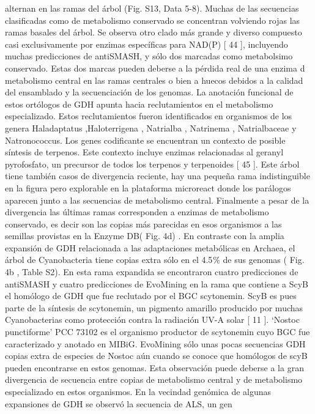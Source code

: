 \documentclass[12pt,twoside]{reedthesis}
\begin{document}
  alternan en las ramas del árbol (Fig. S13, Data 5-8). Muchas de las
  secuencias clasificadas como de metabolismo conservado se concentran
  volviendo rojas las ramas basales del árbol. Se observa otro clado más
  grande y diverso compuesto casi exclusivamente por enzimas específicas
  para NAD(P) {[} 44 {]}, incluyendo muchas predicciones de antiSMASH, y
  sólo dos marcadas como metabolsimo conservado. Estas dos marcas pueden
  deberse a la pérdida real de una enzima d metabolismo central en las
  ramas centrales o bien a huecos debidos a la calidad del ensamblado y la
  secuenciación de los genomas. La anotación funcional de estos ortólogos
  de GDH apunta hacia reclutamientos en el metabolismo especializado.
  Estos reclutamientos fueron identificados en organismos de los genera
  Haladaptatus ,Haloterrigena , Natrialba , Natrinema , Natrialbaceae y
  Natronococcus. Los genes codificante se encuentran un contexto de
  posible síntesis de terpenos. Este contexto incluye enzimas relacionadas
  al geranyl pyrofosfato, un precursor de todos los terpenos y terpenoides
  {[} 45 {]}. Este árbol tiene también casos de divergencia reciente, hay
  una pequeña rama indistinguible en la figura pero explorable en la
  plataforma microreact donde los parálogos aparecen junto a las
  secuencias de metabolismo central. Finalmente a pesar de la divergencia
  las últimas ramas corresponden a enzimas de metabolismo conservado, es
  decir son las copias más parecidas en esos organismos a las semillas
  provistas en la Enzyme DB( Fig. 4d) . En contraste con la amplia
  expansión de GDH relacionada a las adaptaciones metabólicas en Archaea,
  el árbol de Cyanobacteria tiene copias extra sólo en el 4.5 \% de sus
  genomas ( Fig. 4b , Table S2). En esta rama expandida se encontraron
  cuatro predicciones de antiSMASH y cuatro predicciones de EvoMining en
  la rama que contiene a ScyB el homólogo de GDH que fue reclutado por el
  BGC scytonemin. ScyB es pues parte de la síntesis de scytonemin, un
  pigmento amarillo producido por muchas Cyanobacterias como protección
  contra la radiación UV-A solar {[} 11 {]}. `Nostoc punctiforme' PCC
  73102 es el organismo productor de scytonemin cuyo BGC fue caracterizado
  y anotado en MIBiG. EvoMining sólo unas pocas secuencias GDH copias
  extra de especies de Nostoc aún cuando se conoce que homólogos de scyB
  pueden encontrarse en estos genomas. Esta observación puede deberse a la
  gran divergencia de secuencia entre copias de metabolismo central y de
  metabolismo especializado en estos organismos. En la vecindad genómica
  de algunas expansiones de GDH se observó la secuencia de ALS, un gen
\end{document}
